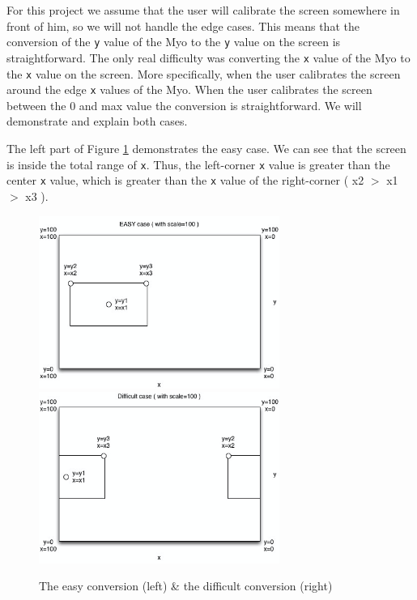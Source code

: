 \documentclass{article}
\begin{document}
For this project we assume that the user will calibrate the screen somewhere in front of him, so we will not handle the edge cases. This means that the conversion of the \texttt{y} value of the Myo to the \texttt{y} value on the screen is straightforward. The only real difficulty was converting the \texttt{x} value of the Myo to the \texttt{x} value on the screen. More specifically, when the user calibrates the screen around the edge \texttt{x} values of the Myo. When the user calibrates the screen between the 0 and max value the conversion is straightforward. We will demonstrate and explain both cases.

The left part of Figure \ref{easyconv} demonstrates the easy case. We can see that the screen is inside the total range of \texttt{x}. Thus, the left-corner \texttt{x} value is greater than the center \texttt{x} value, which is greater than the \texttt{x} value of the right-corner ( x2 $>$ x1 $>$ x3 ).

\begin{figure}[!ht]
  \centering
      \centerline{\includegraphics[width=0.7\textwidth]{Images/easy-conversion.png}
			\includegraphics[width=0.7\textwidth]{Images/diff-conversion.png}}
  \caption{The easy conversion (left) \& the difficult conversion (right)}
	\label{easyconv}
\end{figure}
\end{document}
